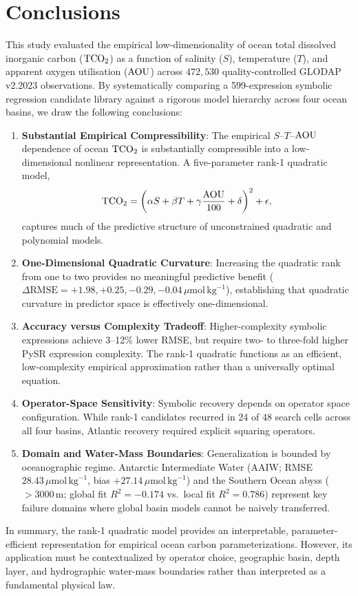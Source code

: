 \section{Conclusions}
This study evaluated the empirical low-dimensionality of ocean total dissolved inorganic carbon ($\mathrm{TCO_2}$) as a function of salinity ($S$), temperature ($T$), and apparent oxygen utilisation ($\mathrm{AOU}$) across $472{,}530$ quality-controlled GLODAP v2.2023 observations. By systematically comparing a 599-expression symbolic regression candidate library against a rigorous model hierarchy across four ocean basins, we draw the following conclusions:

\begin{enumerate}[label=\arabic*.]
\item \textbf{Substantial Empirical Compressibility}: The empirical $S$--$T$--$\mathrm{AOU}$ dependence of ocean $\mathrm{TCO_2}$ is substantially compressible into a low-dimensional nonlinear representation. A five-parameter rank-1 quadratic model,
\begin{equation*}
\mathrm{TCO_2} = \left(\alpha S + \beta T + \gamma \frac{\mathrm{AOU}}{100} + \delta\right)^2 + \epsilon,
\end{equation*}
captures much of the predictive structure of unconstrained quadratic and polynomial models.
\item \textbf{One-Dimensional Quadratic Curvature}: Increasing the quadratic rank from one to two provides no meaningful predictive benefit ($\Delta\mathrm{RMSE} = +1.98, +0.25, -0.29, -0.04\,\mu\mathrm{mol}\,\mathrm{kg}^{-1}$), establishing that quadratic curvature in predictor space is effectively one-dimensional.
\item \textbf{Accuracy versus Complexity Tradeoff}: Higher-complexity symbolic expressions achieve 3--12\% lower RMSE, but require two- to three-fold higher PySR expression complexity. The rank-1 quadratic functions as an efficient, low-complexity empirical approximation rather than a universally optimal equation.
\item \textbf{Operator-Space Sensitivity}: Symbolic recovery depends on operator space configuration. While rank-1 candidates recurred in 24 of 48 search cells across all four basins, Atlantic recovery required explicit squaring operators.
\item \textbf{Domain and Water-Mass Boundaries}: Generalization is bounded by oceanographic regime. Antarctic Intermediate Water (AAIW; RMSE $28.43\,\mu\mathrm{mol}\,\mathrm{kg}^{-1}$, bias $+27.14\,\mu\mathrm{mol}\,\mathrm{kg}^{-1}$) and the Southern Ocean abyss ($>3000$\,m; global fit $R^2 = -0.174$ vs.\ local fit $R^2 = 0.786$) represent key failure domains where global basin models cannot be naively transferred.
\end{enumerate}

In summary, the rank-1 quadratic model provides an interpretable, parameter-efficient representation for empirical ocean carbon parameterizations. However, its application must be contextualized by operator choice, geographic basin, depth layer, and hydrographic water-mass boundaries rather than interpreted as a fundamental physical law.

